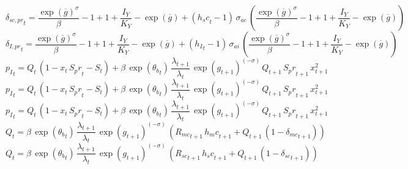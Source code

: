 \begin{dmath}
{{\delta_{sc,pr}}}_{t}=\frac{\exp\left({{\overline{g}}}\right)^{{{\sigma}}}}{{{\beta}}}-1+1+\frac{{{I_Y}}}{{{K_Y}}}-\exp\left({{\overline{g}}}\right)+\left({{h_sc}}_{t}-1\right)\, {{\sigma_{ac}}}\, \left(\frac{\exp\left({{\overline{g}}}\right)^{{{\sigma}}}}{{{\beta}}}-1+1+\frac{{{I_Y}}}{{{K_Y}}}-\exp\left({{\overline{g}}}\right)\right)
\end{dmath}
\begin{dmath}
{{\delta_{I,pr}}}_{t}=\frac{\exp\left({{\overline{g}}}\right)^{{{\sigma}}}}{{{\beta}}}-1+1+\frac{{{I_Y}}}{{{K_Y}}}-\exp\left({{\overline{g}}}\right)+\left({{h_I}}_{t}-1\right)\, {{\sigma_{ai}}}\, \left(\frac{\exp\left({{\overline{g}}}\right)^{{{\sigma}}}}{{{\beta}}}-1+1+\frac{{{I_Y}}}{{{K_Y}}}-\exp\left({{\overline{g}}}\right)\right)
\end{dmath}
\begin{dmath}
{{p_I}}_{t}={{Q}}_{t}\, \left(1-{{x}}_{t}\, {S_pr}_{t}-{S}_{t}\right)+{{\beta}}\, \exp\left({{\theta_b}}_{t}\right)\, \frac{{{\lambda}}_{t+1}}{{{\lambda}}_{t}}\, \exp\left({{g}}_{t+1}\right)^{\left(-{{\sigma}}\right)}\, {{Q}}_{t+1}\, {S_pr}_{t+1}\, {{x}}_{t+1}^{2}
\end{dmath}
\begin{dmath}
{{p_I}}_{t}={{Q}}_{t}\, \left(1-{{x}}_{t}\, {S_pr}_{t}-{S}_{t}\right)+{{\beta}}\, \exp\left({{\theta_b}}_{t}\right)\, \frac{{{\lambda}}_{t+1}}{{{\lambda}}_{t}}\, \exp\left({{g}}_{t+1}\right)^{\left(-{{\sigma}}\right)}\, {{Q}}_{t+1}\, {S_pr}_{t+1}\, {{x}}_{t+1}^{2}
\end{dmath}
\begin{dmath}
{{p_I}}_{t}={{Q}}_{t}\, \left(1-{{x}}_{t}\, {S_pr}_{t}-{S}_{t}\right)+{{\beta}}\, \exp\left({{\theta_b}}_{t}\right)\, \frac{{{\lambda}}_{t+1}}{{{\lambda}}_{t}}\, \exp\left({{g}}_{t+1}\right)^{\left(-{{\sigma}}\right)}\, {{Q}}_{t+1}\, {S_pr}_{t+1}\, {{x}}_{t+1}^{2}
\end{dmath}
\begin{dmath}
{{Q}}_{t}={{\beta}}\, \exp\left({{\theta_b}}_{t}\right)\, \frac{{{\lambda}}_{t+1}}{{{\lambda}}_{t}}\, \exp\left({{g}}_{t+1}\right)^{\left(-{{\sigma}}\right)}\, \left({{R_{mc}}}_{t+1}\, {{h_mc}}_{t+1}+{{Q}}_{t+1}\, \left(1-{{\delta_{mc}}}_{t+1}\right)\right)
\end{dmath}
\begin{dmath}
{{Q}}_{t}={{\beta}}\, \exp\left({{\theta_b}}_{t}\right)\, \frac{{{\lambda}}_{t+1}}{{{\lambda}}_{t}}\, \exp\left({{g}}_{t+1}\right)^{\left(-{{\sigma}}\right)}\, \left({{R_{sc}}}_{t+1}\, {{h_sc}}_{t+1}+{{Q}}_{t+1}\, \left(1-{{\delta_{sc}}}_{t+1}\right)\right)
\end{dmath}
